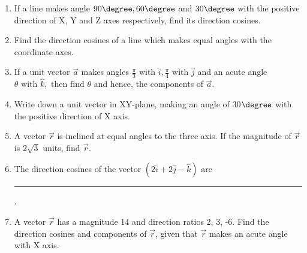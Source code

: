 \begin{enumerate}[label=\thesubsection.\arabic*, ref=\thesubsection.\theenumi]
\item If a line makes angle $90 \degree, 60 \degree$ and $30 \degree$ with the positive direction of X, Y and Z axes respectively, find its direction cosines.
    \item Find the direction cosines of a line which makes equal angles with the coordinate
    axes.
		\\
		\solution
		
\item If a unit vector $\overrightarrow{a}$ makes angles $\frac{\pi}{3}\text{ with }\hat{i},  \frac{\pi}{4}\text{ with }\hat{j}$ and an acute angle $\theta \text{ with }\hat{k}, \text{ then find } \theta$ and hence,  the components of $\overrightarrow{a}$.
	\\
		\solution
		
\item Write down a unit vector in XY-plane,  making an angle of 30$\degree$ with the positive direction of X axis.\\
\item A vector $\vec{r}$ is inclined at equal angles to the three axis. If the magnitude of $\vec{r}$ is $2\sqrt{3}$ units,  find $\vec{r}$.
\item The direction cosines of the vector $(2\hat{i}+2\hat{j}-\hat{k})$ are \noindent\rule{2cm}{0.4pt}.
\item A vector $\vec{r}$ has a magnitude 14 and direction ratios 2,  3,  -6. Find the direction cosines and components of $\vec{r}$,  given that $\vec{r}$ makes an acute angle with X axis.
\end{enumerate}
